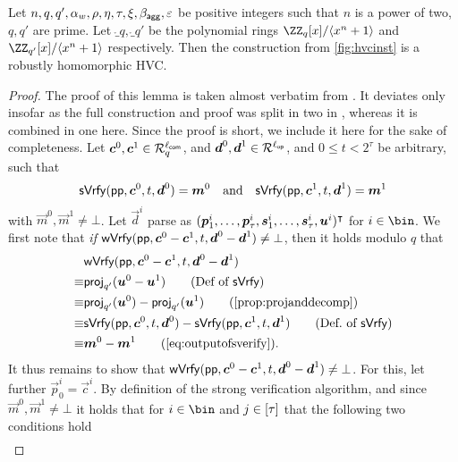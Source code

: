 \begin{lemma}\label{lem:hvcrobhom}
  Let $n,q,q',\alpha_w,\rho,\eta,\tau,\xi,\beta_{\mathsf{agg}},\varepsilon$ be positive integers such that $n$ is a power of two, $q,q'$ are prime.
  Let $\ring_q,\ring_{q'}$ be the polynomial rings $\ZZ_q[x]/\langle x^n+1\rangle$ and $\ZZ_{q'}[x]/\langle x^n+1\rangle$ respectively.
  Then the construction from \autoref{fig:hvcinst} is a robustly homomorphic HVC.
\end{lemma}
\begin{proof}
The proof of this lemma is taken almost verbatim from \cite{CCS:FleSimZha22}.
It deviates only insofar as the full construction and proof was split in two in \cite{CCS:FleSimZha22}, whereas it is combined in one here.
Since the proof is short, we include it here for the sake of completeness. %
Let $\boldsymbol{c}^0,\boldsymbol{c}^1 \in \mathcal{R}_q^{\ell_{\mathsf{com}}}$, and $\boldsymbol{d}^0, \boldsymbol{d}^1 \in \mathcal{R}^{\ell_{\mathsf{op}}}$, and $0\leq t <2^\tau$ be arbitrary, such that
\begin{equation}
    \mathsf{sVrfy}(\mathsf{pp},\boldsymbol{c}^0, t,\boldsymbol{d}^0)=\boldsymbol{m}^0 \quad \text{and} \quad \mathsf{sVrfy}(\mathsf{pp},\boldsymbol{c}^1, t,\boldsymbol{d}^1)=\boldsymbol{m}^1\label{eq:outputofsverify}
\end{equation}
with $\vec{m}^0,\vec{m}^1\neq \bot$.
Let $\vec{d}^i$ parse as $(\boldsymbol{p}^i_1,\dots,\boldsymbol{p}^i_{\tau},\boldsymbol{s}^i_1, \dots, \boldsymbol{s}^i_{\tau},\boldsymbol{u}^i)^\intercal$ for $i\in\bin$.
We first note that \emph{if} $\mathsf{wVrfy}(\mathsf{pp},\boldsymbol{c}^0-\boldsymbol{c}^1, t,\boldsymbol{d}^0-\boldsymbol{d}^1)\neq\bot$, then it holds modulo $q$ that
\begin{align*}
  &\wverify(\params,\vec{c}^0-\vec{c}^1, t,\vec{d}^0-\vec{d}^1)\\
  \equiv&\proj_{q'}(\vec{u}^0-\vec{u}^1)\tag{Def of $\sverify$}\\
  \equiv&\proj_{q'}(\vec{u}^0)-\proj_{q'}(\vec{u}^1)\tag{\autoref{prop:projanddecomp}}\\
  \equiv&\sverify(\params,\vec{c}^0, t,\vec{d}^0)-\sverify(\params,\vec{c}^1, t,\vec{d}^1)\tag{Def.\ of $\sverify$}\\
  \equiv&\vec{m}^0- \vec{m}^1 \tag{\autoref{eq:outputofsverify}}.
\end{align*}
%
It thus remains to show that $\mathsf{wVrfy}(\mathsf{pp},\boldsymbol{c}^0-\boldsymbol{c}^1, t,\boldsymbol{d}^0-\boldsymbol{d}^1)\neq\bot$.
For this, let further $\vec{p}^i_0 = \vec{c}^i$.
By definition of the strong verification algorithm, and since $\vec{m}^0,\vec{m}^1\neq\bot$ it holds that for $i\in\bin$ 
and $j \in [\tau]$ that the following two conditions hold
\begin{align}

\end{align}
\end{proof}
